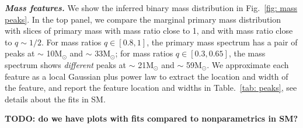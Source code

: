 \documentclass[%
    aps,
    prl,
    reprint,
    superscriptaddress,
    nolongbibliography,
    nobibnotes,
    nofootinbib,
    linenumbers,
    amsmath,amssymb,
]{revtex4-2}
\newcommand{\Msun}{\ensuremath{\mathrm{M}_{\odot}}}
\newcommand{\todo}[1]{{\color{Blue}\bf TODO: #1}}
\newcommand{\jh}[1]{{\color{orange}JH: #1}}
\newcommand{\featTen}{10\xspace}
\newcommand{\featTwenty}{21\xspace}
\newcommand{\featThirtyFive}{33\xspace}
\newcommand{\featSixty}{59\xspace}
\newcommand{\heading}[1]{\textbf{\textit{#1}}}
\begin{document}
\heading{Mass features.}
We show the inferred binary mass distribution in Fig.~\ref{fig: mass peaks}. In the top panel, we compare the marginal primary mass distribution with slices of primary mass with mass ratio close to 1, and with mass ratio close to $q\sim 1/2$. For mass ratios $q\in [0.8,1]$, the primary mass spectrum has a pair of peaks at $\sim$ \featTen $\Msun$ and $\sim$ \featThirtyFive $\Msun$; for mass ratios $q\in [0.3,0.65]$, the mass spectrum shows \textit{different} peaks at $\sim$ \featTwenty $\Msun$ and $\sim$ \featSixty $\Msun$. We approximate each feature as a local Gaussian plus power law to extract the location and width of the feature, and report the feature location and widths in Table.~\ref{tab: peaks}, see details about the fits in SM.


\todo{do we have plots with fits compared to nonparametrics in SM?}

\end{document}
